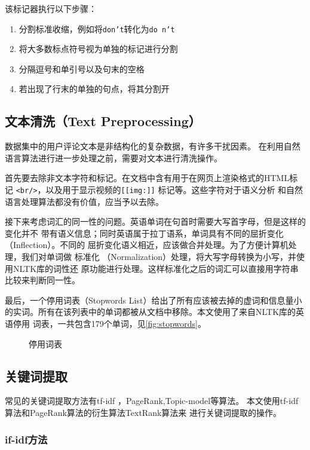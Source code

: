 该标记器执行以下步骤：
\begin{enumerate}
\item 分割标准收缩，例如将\texttt{don't}转化为\texttt{do n't}
\item 将大多数标点符号视为单独的标记进行分割
\item 分隔逗号和单引号以及句末的空格
\item 若出现了行末的单独的句点，将其分割开
\end{enumerate}

\subsection{文本清洗（Text Preprocessing）}
数据集中的用户评论文本是非结构化的复杂数据，有许多干扰因素。
在利用自然语言算法进行进一步处理之前，需要对文本进行清洗操作。

首先要去除非文本字符和标记。在文档中含有用于在网页上渲染格式的HTML标记
\texttt{<br/>}，以及用于显示视频的\texttt{[[img:]]} 标记等。这些字符对于语义分析
和自然语言处理算法都没有价值，应当予以去除。

接下来考虑词汇的同一性的问题。英语单词在句首时需要大写首字母，但是这样的变化并不
带有语义信息；同时英语属于拉丁语系，单词具有不同的屈折变化（Inflection）。不同的
屈折变化语义相近，应该做合并处理。为了方便计算机处理，我们对单词做{\fKai
标准化} （Normalization）处理，将大写字母转换为小写，并使用NLTK库的{\fKai 词性还
原}功能进行处理。这样标准化之后的词汇可以直接用字符串比较来判断同一性。

最后，一个{\fKai 停用词表}（Stopwords List）给出了所有应该被去掉的虚词和信息量小
的实词。所有在该列表中的单词都被从文档中移除。本文使用了来自NLTK库的英语停用
词表，一共包含179个单词，见\autoref{fig:stopwords}。

\begin{figure}
    \noindent{}
\caption{停用词表}\label{fig:stopwords}
\end{figure}

\subsection{关键词提取}
常见的关键词提取方法有tf-idf ，PageRank,Topic-model等算法。
本文使用tf-idf算法和PageRank算法的衍生算法TextRank算法来
进行关键词提取的操作。

\subsubsection{if-idf方法}

